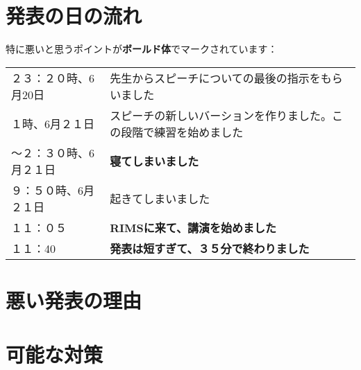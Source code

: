 \documentclass[12pt]{article} %
\begin{document}
\section{発表の日の流れ}
特に悪いと思うポイントが\textbf{ボールド体}でマークされています：
\begin{center}
	\begin{tabular}[]{lp{}}
		２３：２０時、6月20日&先生からスピーチについての最後の指示をもらいました\\
		１時、6月２１日&スピーチの新しいバーションを作りました。この段階で練習を始めました\\
		〜２：３０時、6月２１日&{\bf 寝てしまいました}\\
		９：５０時、6月２１日&起きてしまいました\\
		１１：０５&{\bf RIMSに来て、講演を始めました}\\
		１１：40&{\bf 発表は短すぎて、３５分で終わりました}\\
	\end{tabular}
\end{center}
\section{悪い発表の理由}
\section{可能な対策}
\end{document}

